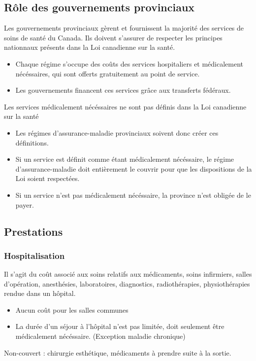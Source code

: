 \documentclass[10pt, french]{article}
\begin{document}
\begin{multicols*}{3}
\subsection{Rôle des gouvernements provinciaux}
Les gouvernements provinciaux gèrent et fournissent la majorité des services de soins de santé du Canada. Ils doivent s'assurer de respecter les principes nationnaux présents dans la Loi canadienne sur la santé.
	\begin{itemize}
	\item	Chaque régime s'occupe des coûts des services hospitaliers et médicalement nécéssaires, qui sont offerts gratuitement au point de service.
	\item 	Les gouvernements financent ces services grâce aux transferts fédéraux.
	\end{itemize}
Les services médicalement nécéssaires ne sont pas définis dans la Loi canadienne sur la santé
	\begin{itemize}
	\item 	Les régimes d'assurance-maladie provinciaux soivent donc créer ces définitions.
	\item 	Si un service est définit comme étant médicalement nécéssaire, le régime d'assurance-maladie doit entièrement le couvrir pour que les dispositions de la Loi soient respectées.
	\item	Si un service n'est pas médicalement nécéssaire, la province n'est obligée de le payer.
	\end{itemize}



\subsection{Prestations}
	\subsubsection*{Hospitalisation}
	Il s'agit du coût associé aux soins relatifs aux médicaments, soins infirmiers, salles d'opération, anesthésies, laboratoires, diagnostics, radiothérapies, physiothérapies rendue dans un hôpital.
		\begin{itemize}
		\item 	Aucun coût pour les salles communes
		\item 	La durée d'un séjour à l'hôpital n'est pas limitée, doit seulement être médicalement nécéssaire. (Exception maladie chronique)
		\end{itemize}
	Non-couvert : chirurgie esthétique, médicaments à prendre suite à la sortie.

\end{multicols*}
\end{document}
